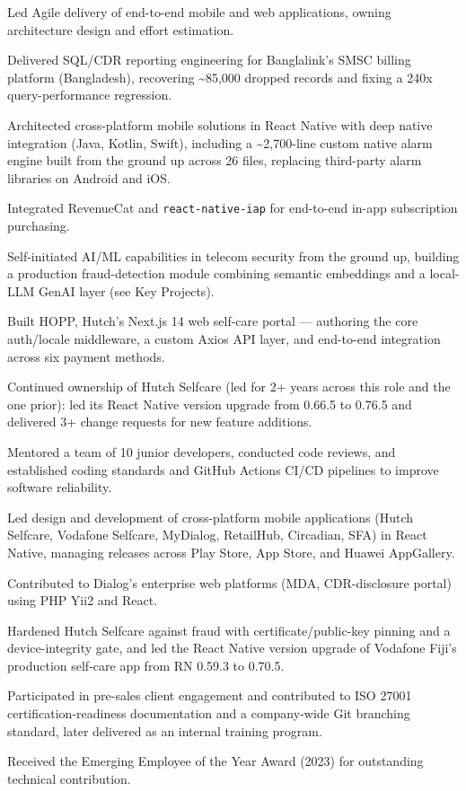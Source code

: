 \documentclass[10.5pt]{article}
\begin{document}
\begin{cvitems}
  \item Led Agile delivery of end-to-end mobile and web applications, owning architecture design and effort estimation.
  \item Delivered SQL/CDR reporting engineering for Banglalink's SMSC billing platform (Bangladesh), recovering \textasciitilde85,000 dropped records and fixing a 240x query-performance regression.
  \item Architected cross-platform mobile solutions in React Native with deep native integration (Java, Kotlin, Swift), including a \textasciitilde2,700-line custom native alarm engine built from the ground up across 26 files, replacing third-party alarm libraries on Android and iOS.
  \item Integrated RevenueCat and \texttt{react-native-iap} for end-to-end in-app subscription purchasing.
  \item Self-initiated AI/ML capabilities in telecom security from the ground up, building a production fraud-detection module combining semantic embeddings and a local-LLM GenAI layer (see Key Projects).
  \item Built HOPP, Hutch's Next.js 14 web self-care portal --- authoring the core auth/locale middleware, a custom Axios API layer, and end-to-end integration across six payment methods.
  \item Continued ownership of Hutch Selfcare (led for 2+ years across this role and the one prior): led its React Native version upgrade from 0.66.5 to 0.76.5 and delivered 3+ change requests for new feature additions.
  \item Mentored a team of 10 junior developers, conducted code reviews, and established coding standards and GitHub Actions CI/CD pipelines to improve software reliability.
\end{cvitems}

\begin{cvitems}
  \item Led design and development of cross-platform mobile applications (Hutch Selfcare, Vodafone Selfcare, MyDialog, RetailHub, Circadian, SFA) in React Native, managing releases across Play Store, App Store, and Huawei AppGallery.
  \item Contributed to Dialog's enterprise web platforms (MDA, CDR-disclosure portal) using PHP Yii2 and React.
  \item Hardened Hutch Selfcare against fraud with certificate/public-key pinning and a device-integrity gate, and led the React Native version upgrade of Vodafone Fiji's production self-care app from RN 0.59.3 to 0.70.5.
  \item Participated in pre-sales client engagement and contributed to ISO 27001 certification-readiness documentation and a company-wide Git branching standard, later delivered as an internal training program.
  \item Received the Emerging Employee of the Year Award (2023) for outstanding technical contribution.
\end{cvitems}
\end{document}
